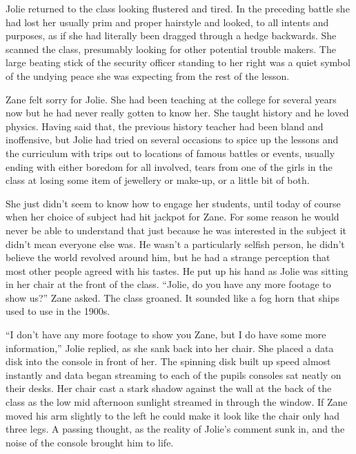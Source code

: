 \thoughtbreak



Jolie returned to the class looking flustered and tired.  In the preceding battle she had lost her usually prim and proper hairstyle and looked, to all intents and purposes, as if she had literally been dragged through a hedge backwards.  She scanned the class, presumably looking for other potential trouble makers.  The large beating stick of the security officer standing to her right was a quiet symbol of the undying peace she was expecting from the rest of the lesson.  

Zane felt sorry for Jolie.  She had been teaching at the college for several years now but he had never really gotten to know her.  She taught history and he loved physics.  Having said that, the previous history teacher had been bland and inoffensive, but Jolie had tried on several occasions to spice up the lessons and the curriculum with trips out to locations of famous battles or events, usually ending with either boredom for all involved, tears from one of the girls in the class at losing some item of jewellery or make-up, or a little bit of both.

She just didn't seem to know how to engage her students,  until today of course when her choice of subject had hit jackpot for Zane.  For some reason he would never be able to understand that just because he was interested in the subject it didn't mean everyone else was.  He wasn't a particularly selfish person, he didn't believe the world revolved around him, but he had a strange perception that most other people agreed with his tastes.  He put up his hand as Jolie was sitting in her chair at the front of the class.  ``Jolie, do you have any more footage to show us?'' Zane asked.  The class groaned.  It sounded like a fog horn that ships used to use in the 1900s.  

``I don't have any more footage to show you Zane, but I do have some more information,'' Jolie replied, as she sank back into her chair.  She placed a data disk into the console in front of her.  The spinning disk built up speed almost instantly and data began streaming to each of the pupils consoles sat neatly on their desks.  Her chair cast a stark shadow against the wall at the back of the class as the low mid afternoon sunlight streamed in through the window.  If Zane moved his arm slightly to the left he could make it look like the chair only had three legs.  A passing thought, as the reality of Jolie's comment sunk in, and the noise of the console brought him to life.

